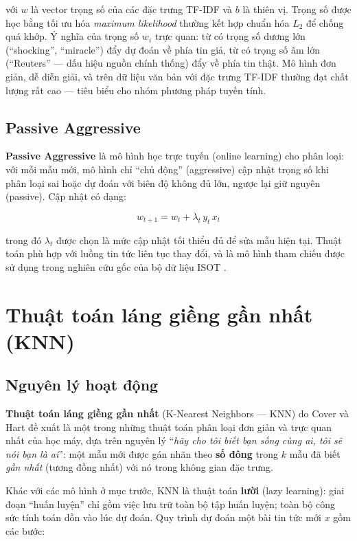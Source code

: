 với $w$ là vector trọng số của các đặc trưng TF-IDF và $b$ là thiên vị. Trọng số được học bằng tối ưu hóa \textit{maximum likelihood} thường kết hợp chuẩn hóa $L_2$ để chống quá khớp. Ý nghĩa của trọng số $w_i$ trực quan: từ có trọng số dương lớn (``shocking'', ``miracle'') đẩy dự đoán về phía tin giả, từ có trọng số âm lớn (``Reuters'' --- dấu hiệu nguồn chính thống) đẩy về phía tin thật. Mô hình đơn giản, dễ diễn giải, và trên dữ liệu văn bản với đặc trưng TF-IDF thường đạt chất lượng rất cao --- tiêu biểu cho nhóm phương pháp tuyến tính.

\subsection{Passive Aggressive}

\textbf{Passive Aggressive} là mô hình học trực tuyến (online learning) cho phân loại: với mỗi mẫu mới, mô hình chỉ ``chủ động'' (aggressive) cập nhật trọng số khi phân loại sai hoặc dự đoán với biên độ không đủ lớn, ngược lại giữ nguyên (passive). Cập nhật có dạng:

\begin{equation}
    w_{t+1} = w_t + \lambda_t \, y_t \, x_t
    \label{eq:pa}
\end{equation}

trong đó $\lambda_t$ được chọn là mức cập nhật tối thiểu đủ để sửa mẫu hiện tại. Thuật toán phù hợp với luồng tin tức liên tục thay đổi, và là mô hình tham chiếu được sử dụng trong nghiên cứu gốc của bộ dữ liệu ISOT \cite{ahmed2017}.

\section{Thuật toán láng giềng gần nhất (KNN)}

\subsection{Nguyên lý hoạt động}

\textbf{Thuật toán láng giềng gần nhất} (K-Nearest Neighbors --- KNN) do Cover và Hart đề xuất \cite{coverhart} là một trong những thuật toán phân loại đơn giản và trực quan nhất của học máy, dựa trên nguyên lý ``\textit{hãy cho tôi biết bạn sống cùng ai, tôi sẽ nói bạn là ai}'': một mẫu mới được gán nhãn theo \textbf{số đông} trong $k$ mẫu đã biết \textit{gần nhất} (tương đồng nhất) với nó trong không gian đặc trưng.

Khác với các mô hình ở mục trước, KNN là thuật toán \textbf{lười} (lazy learning): giai đoạn ``huấn luyện'' chỉ gồm việc lưu trữ toàn bộ tập huấn luyện; toàn bộ công sức tính toán dồn vào lúc dự đoán. Quy trình dự đoán một bài tin tức mới $x$ gồm các bước:

